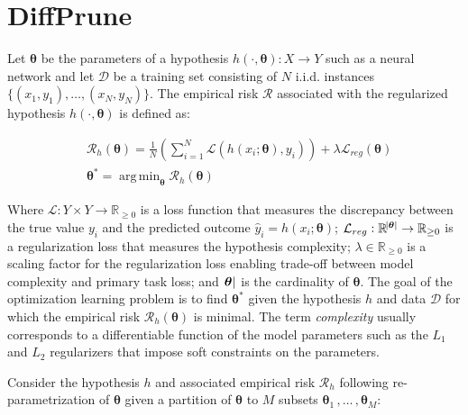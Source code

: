 \documentclass[final,1p,times]{elsarticle}
\DeclareMathOperator*{\argmin}{arg\,min}
\begin{document}
\section{DiffPrune}
\label{S:DiffPrune}
Let $\boldsymbol{\theta}$ be the parameters of a hypothesis $h(\cdot,\boldsymbol{\theta}): X \rightarrow Y$ such as a neural network and let $\mathcal{D}$ be a training set consisting of $N$ i.i.d. instances $\{(x_1,y_1),\ldots, (x_N,y_N)\}$. The empirical risk $\mathcal{R}$ associated with the regularized hypothesis $h(\cdot,\boldsymbol{\theta})$ is defined as:

\begin{align}
\label{eq:Symmetric C}
& \mathcal{R}_h(\boldsymbol{\theta}) = \frac{1}{N} \left(\sum_{i=1}^{N}\mathcal{L} \left( h(x_i;\boldsymbol{\theta}),y_i \right) \right) + \lambda \mathcal{L}_{reg}(\boldsymbol{\theta}) \\
& \boldsymbol{\theta}^{*} = \argmin_{\boldsymbol{\theta}} \mathcal{R}_h(\boldsymbol{\theta})
\end{align}

Where $\mathcal{L}:Y \times Y \rightarrow \mathbb{R}_{\geq 0}$ is a loss function that measures the discrepancy between the true value $y_i$ and the predicted outcome $\hat{y}_i = h(x_i;\boldsymbol{\theta})$; $\mathcal{L}_{reg}: \mathbb{R}^{\abs{\boldsymbol{\theta}}} \rightarrow \mathbb{R}_{\geq 0}$ is a regularization loss that measures the hypothesis complexity; $\lambda \in \mathbb{R}_{\geq 0}$ is a scaling factor for the regularization loss enabling trade-off between model complexity and primary task loss; and $\abs{\boldsymbol{\theta}}$ is the cardinality of $\boldsymbol{\theta}$. The goal of the optimization learning problem is to find $\boldsymbol{\theta}^{*}$ given the hypothesis $h$ and data $\mathcal{D}$ for which the empirical risk $\mathcal{R}_h(\boldsymbol{\theta})$ is minimal. The term \textit{complexity} usually corresponds to a differentiable function of the model parameters such as the $L_1$ and $L_2$ regularizers that impose soft constraints on the parameters.

Consider the hypothesis $h$ and associated empirical risk $\mathcal{R}_h$ following re-parametrization of $\boldsymbol{\theta}$ given a partition of $\boldsymbol{\theta}$ to $M$ subsets $\boldsymbol{\theta}_1 \, , \ldots  \, , \boldsymbol{\theta}_M$:
\end{document}
